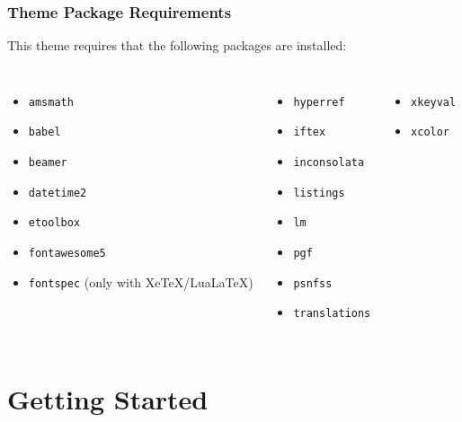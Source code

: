 \documentclass[utf8,aspectratio=169,ngerman,english]{beamer}
\begin{document}
\begin{frame}
\frametitle{Theme Package Requirements}

This theme requires that the following packages are installed:
\begin{columns}[onlytextwidth]
\begin{itemize}
\item \texttt{amsmath}
\item \texttt{babel}
\item \texttt{beamer}
\item \texttt{datetime2}
\item \texttt{etoolbox}
\item \texttt{fontawesome5}
\item \texttt{fontspec} (only with XeTeX/LuaLaTeX)
\end{itemize}

\begin{itemize}
\item \texttt{hyperref}
\item \texttt{iftex}
\item \texttt{inconsolata}
\item \texttt{listings}
\item \texttt{lm}
\item \texttt{pgf}
\item \texttt{psnfss}
\item \texttt{translations}
\end{itemize}

\begin{itemize}
\item \texttt{xkeyval}
\item \texttt{xcolor}
\end{itemize}
\end{columns}
\end{frame}


\section{Getting Started}
\end{document}
